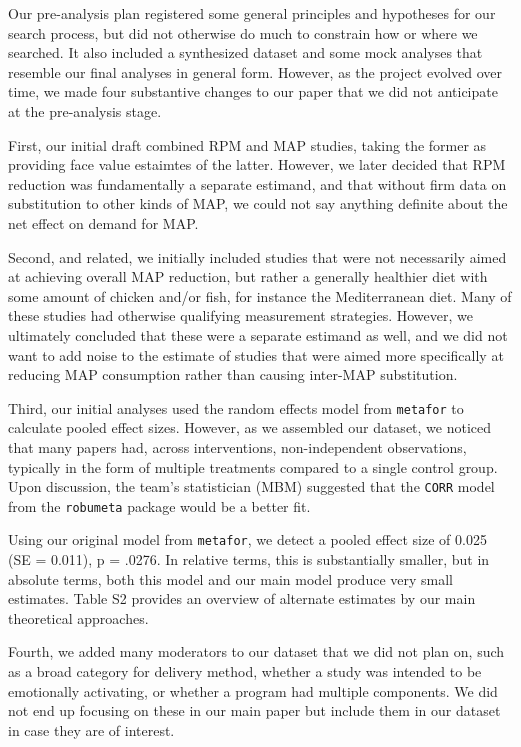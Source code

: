\documentclass[sn-nature,pdflatex]{sn-jnl}
\begin{document}
Our pre-analysis plan registered some general principles and hypotheses
for our search process, but did not otherwise do much to constrain how
or where we searched. It also included a synthesized dataset and some
mock analyses that resemble our final analyses in general form. However,
as the project evolved over time, we made four substantive changes to
our paper that we did not anticipate at the pre-analysis stage.

First, our initial draft combined RPM and MAP studies, taking the former
as providing face value estaimtes of the latter. However, we later
decided that RPM reduction was fundamentally a separate estimand, and
that without firm data on substitution to other kinds of MAP, we could
not say anything definite about the net effect on demand for MAP.

Second, and related, we initially included studies that were not
necessarily aimed at achieving overall MAP reduction, but rather a
generally healthier diet with some amount of chicken and/or fish, for
instance the Mediterranean diet. Many of these studies had otherwise
qualifying measurement strategies. However, we ultimately concluded that
these were a separate estimand as well, and we did not want to add noise
to the estimate of studies that were aimed more specifically at reducing
MAP consumption rather than causing inter-MAP substitution.

Third, our initial analyses used the random effects model from
\texttt{metafor} to calculate pooled effect sizes. However, as we
assembled our dataset, we noticed that many papers had, across
interventions, non-independent observations, typically in the form of
multiple treatments compared to a single control group. Upon discussion,
the team's statistician (MBM) suggested that the \texttt{CORR} model
from the \texttt{robumeta} package would be a better fit.

Using our original model from \texttt{metafor}, we detect a pooled
effect size of 0.025 (SE = 0.011), p = .0276. In relative terms, this is
substantially smaller, but in absolute terms, both this model and our
main model produce very small estimates. Table S2 provides an overview
of alternate estimates by our main theoretical approaches.

Fourth, we added many moderators to our dataset that we did not plan on,
such as a broad category for delivery method, whether a study was
intended to be emotionally activating, or whether a program had multiple
components. We did not end up focusing on these in our main paper but
include them in our dataset in case they are of interest.
\end{document}
